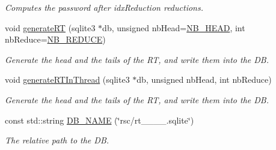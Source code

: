 \begin{DoxyCompactItemize}
\begin{DoxyCompactList}\small\item\em Computes the password after idx\+Reduction reductions. \end{DoxyCompactList}\item 
void \hyperlink{namespacebe_1_1esi_1_1secl_1_1pn_af8b773cad93b0eb78b89f69721e4bb1d}{generate\+RT} (sqlite3 $\ast$db, unsigned nb\+Head=\hyperlink{namespacebe_1_1esi_1_1secl_1_1pn_a3f7aaccb1bf4e47f92d72bf9b2471328}{N\+B\+\_\+\+H\+E\+AD}, int nb\+Reduce=\hyperlink{namespacebe_1_1esi_1_1secl_1_1pn_a9434f9e96778e243fcb677633df38598}{N\+B\+\_\+\+R\+E\+D\+U\+CE})
\begin{DoxyCompactList}\small\item\em Generate the head and the tails of the RT, and write them into the DB. \end{DoxyCompactList}\item 
void \hyperlink{namespacebe_1_1esi_1_1secl_1_1pn_aaf5216f5718720c15b5925f7e8a94d10}{generate\+R\+T\+In\+Thread} (sqlite3 $\ast$db, unsigned nb\+Head, int nb\+Reduce)
\begin{DoxyCompactList}\small\item\em Generate the head and the tails of the RT, and write them into the DB. \end{DoxyCompactList}\item 
const std\+::string \hyperlink{namespacebe_1_1esi_1_1secl_1_1pn_a6b6903f68a7fbdcd8e705dc2b9c28c03}{D\+B\+\_\+\+N\+A\+ME} (\char`\"{}rsc/rt\+\_\+\_\+\_\+\_.\+sqlite\char`\"{})
\begin{DoxyCompactList}\small\item\em The relative path to the DB. \end{DoxyCompactList}\end{DoxyCompactItemize}
